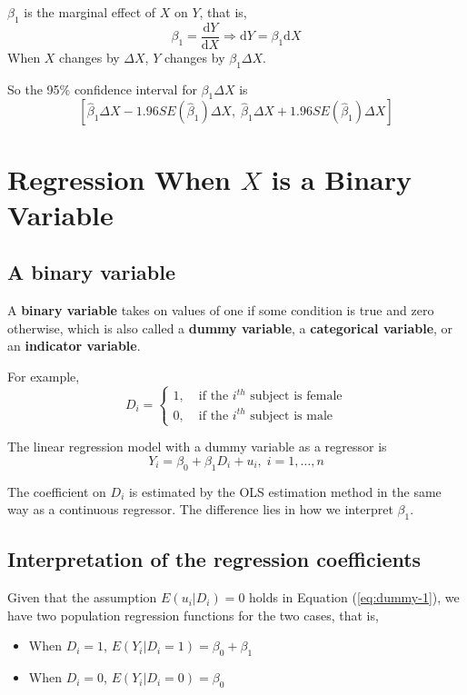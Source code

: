 \documentclass[a4paper,11pt]{article}
\newcommand{\dx}{\mathrm{d}}
\begin{document}
\(\beta_1\) is the marginal effect of \(X\) on \(Y\), that is, 
\[ \beta_1 = \frac{\dx Y}{ \dx X} \Rightarrow \dx Y = \beta_1 \dx X \]
When \(X\) changes by \(\Delta X\), \(Y\) changes by \(\beta_1 \Delta X\). 

So the 95\% confidence interval for \(\beta_1 \Delta X\) is
\[ \left[ \hat{\beta}_1 \Delta X - 1.96 SE(\hat{\beta}_1) \Delta X,\;
\hat{\beta}_1 \Delta X + 1.96SE(\hat{\beta}_1) \Delta X \right] \]


\section{Regression When \(X\) is a Binary Variable}
\label{sec:org7e9195e}

\subsection{A binary variable}
\label{sec:org34dcb58}

A \textbf{binary variable} takes on values of one if some condition is true
and zero otherwise, which is also called a \textbf{dummy variable}, a
\textbf{categorical variable}, or an \textbf{indicator variable}.

For example, 
\begin{equation*}
D_i = 
\begin{cases}
1,\; &\text{if the } i^{th} \text{ subject is female} \\
0,\; &\text{if the } i^{th} \text{ subject is male} 
\end{cases}
\end{equation*}

The linear regression model with a dummy variable as a regressor is
\begin{equation}
\label{eq:dummy-1}
Y_i = \beta_0 + \beta_1 D_i + u_i,\; i = 1, \ldots, n
\end{equation}

The coefficient on \(D_i\) is estimated by the OLS estimation method
in the same way as a continuous regressor. The difference lies in how
we interpret \(\beta_1\). 


\subsection{Interpretation of the regression coefficients}
\label{sec:org6b9b87b}

Given that the assumption \(E(u_i | D_i) = 0\) holds in Equation
(\ref{eq:dummy-1}), we have two population regression functions for
the two cases, that is,
\begin{itemize}
\item When \(D_i = 1\), \(E(Y_i|D_i = 1) = \beta_0 + \beta_1\)
\item When \(D_i = 0\), \(E(Y_i|D_i = 0) = \beta_0\)
\end{itemize}
\end{document}
